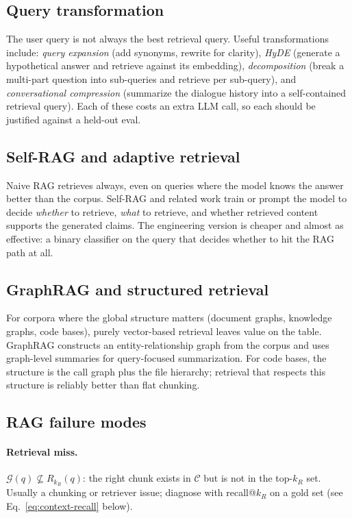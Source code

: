\subsection{Query transformation}

The user query is not always the best retrieval query. Useful
transformations include: \emph{query expansion} (add synonyms,
rewrite for clarity), \emph{HyDE} (generate a hypothetical answer
and retrieve against its embedding), \emph{decomposition} (break a
multi-part question into sub-queries and retrieve per sub-query),
and \emph{conversational compression} (summarize the dialogue
history into a self-contained retrieval query). Each of these
costs an extra LLM call, so each should be justified against a
held-out eval.

\subsection{Self-RAG and adaptive retrieval}

Naive RAG retrieves always, even on queries where the model
knows the answer better than the corpus. Self-RAG
\citep{asai2024selfrag} and related work train or prompt the model
to decide \emph{whether} to retrieve, \emph{what} to retrieve, and
whether retrieved content supports the generated claims. The
engineering version is cheaper and almost as effective: a binary
classifier on the query that decides whether to hit the RAG path
at all.

\subsection{GraphRAG and structured retrieval}

For corpora where the global structure matters (document graphs,
knowledge graphs, code bases), purely vector-based retrieval leaves
value on the table. GraphRAG \citep{edge2024graphrag} constructs an
entity-relationship graph from the corpus and uses graph-level
summaries for query-focused summarization. For code bases, the
structure is the call graph plus the file hierarchy; retrieval that
respects this structure is reliably better than flat chunking.

\subsection{RAG failure modes}
\label{sec:rag-failure-modes}

\paragraph{Retrieval miss.} $\mathcal{G}(q) \not\subseteq R_{k_R}(q)$: the
right chunk exists in $\mathcal{C}$ but is not in the top-$k_R$ set.
Usually a chunking or retriever issue; diagnose with
recall@$k_R$ on a gold set (see Eq.~\eqref{eq:context-recall}
below).

